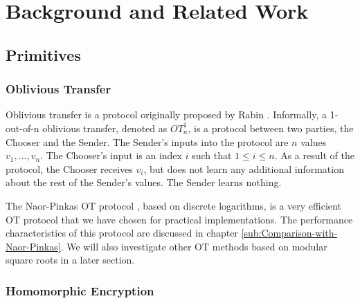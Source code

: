 
\section{Background and Related Work}


\subsection{Primitives \label{sub:Primitives}}


\subsubsection{Oblivious Transfer}

Oblivious transfer is a protocol originally proposed by Rabin \cite{Rabin81}.
Informally, a 1-out-of-n oblivious transfer, denoted as $OT_{n}^{1}$,
is a protocol between two parties, the Chooser and the Sender. The
Sender's inputs into the protocol are $n$ values $v_{1},...,v_{n}$.
The Chooser's input is an index $i$ such that $1\le i\le n$. As
a result of the protocol, the Chooser receives $v_{i}$, but does
not learn any additional information about the rest of the Sender's
values. The Sender learns nothing. 

The Naor-Pinkas OT protocol \cite{NaorPinkas99}, based on discrete
logarithms, is a very efficient OT protocol that we have chosen for practical
implementations.  The performance characteristics of this protocol
are discussed in chapter \ref{sub:Comparison-with-Naor-Pinkas}.  We will also
investigate other OT methods based on modular square roots in a later section.

\subsubsection{Homomorphic Encryption}

